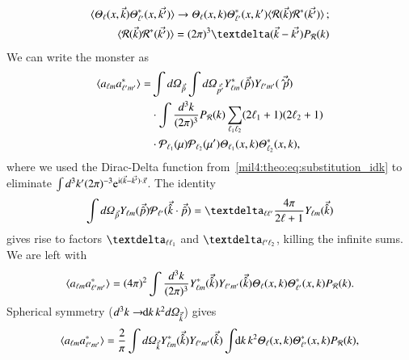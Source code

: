 \begin{equation}\label{mil4:theo:eq:substitution_idk}
\begin{split}
    \langle \Theta_\ell(x,\vec{k}) \Theta_{\ell'}^*(x,\vec{k'})\rangle \to \Theta_\ell(x,k) \Theta_{\ell'}^*(x,k') \langle \mathcal{R}(\vec{k}) \mathcal{R}^*(\vec{k'}) \rangle \,; \\
    \quad \langle \mathcal{R}(\vec{k}) \mathcal{R}^*(\vec{k'}) \rangle = (2\pi)^3 \deltafunc{\vec{k}-\vec{k'}} P_\mathcal{R}(k) 
\end{split}
\end{equation}
We can write the monster as
\begin{equation}
\begin{split}
    \langle a\ellm a^*\ellmp \rangle =&  \int \dOmg[p] \int \dOmg[p'] Y_{\ell m}^*(\vec{\hat{p}}) Y_{\ell' m'}(\vec{\hat{p}'})  \\
    &\cdot \int \frac{d^3k}{(2\pi)^3}  P_\mathcal{R}(k)  \sum_{\ell_1 \ell_2} (2\ell_1 +1) (2\ell_2 +1) \\
    &\cdot \mathcal{P}_{\ell_1}(\mu)\mathcal{P}_{\ell_2}(\mu')\Theta_{\ell_1}(x,k) \Theta^{*}_{\ell_2}(x,k) ,
\end{split}
\end{equation} 
where we used the Dirac-Delta function from~\cref{mil4:theo:eq:substitution_idk} to eliminate $\int d^3k' (2\pi)^{-3} \eu[\im (\vec{k}-\vec{k'})\cdot \vec{x}]$. The identity 
\begin{equation}
    \int \dOmg[p] Y\ellm (\vec{\hat{p}}) \mathcal{P}_{\ell'}(\vec{\hat{k}}\cdot \vec{\hat{p}}) = \deltasym{\ell \ell'} \frac{4\pi}{2\ell +1}Y\ellm (\vec{\hat{k}})
\end{equation}
gives rise to factors $\deltasym{\ell \ell_1}$ and $\deltasym{\ell' \ell_2}$, killing the infinite sums. We are left with
\begin{equation}
    \langle a\ellm a^*\ellmp \rangle =  (4\pi)^2 \int \frac{d^3k}{(2\pi)^3} Y_{\ell m}^*(\vec{\hat{k}}) Y_{\ell' m'}(\vec{\hat{k}})  \Theta_{\ell}(x,k) \Theta^{*}_{\ell'}(x,k) P_\mathcal{R}(k).
\end{equation}
Spherical symmetry ($d^3k \to \dx{k} k^2 \dOmg[k]$) gives 
\begin{equation}
    \langle a\ellm a^*\ellmp \rangle = \frac{2}{\pi} \int \dOmg[k] Y_{\ell m}^*(\vec{\hat{k}}) Y_{\ell' m'}(\vec{\hat{k}}) \int \dx{k} k^2  \Theta_{\ell}(x,k) \Theta^{*}_{\ell'}(x,k)  P_\mathcal{R}(k),
\end{equation}
